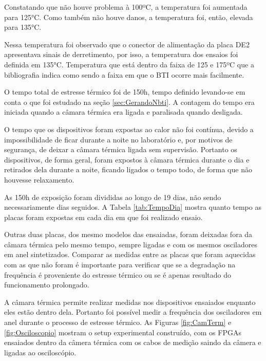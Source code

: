 Constatando que não houve problema à 100ºC, a temperatura foi aumentada para 125°C. Como também não houve danos, a temperatura foi, então, elevada para 135°C.

Nessa temperatura foi observado que o conector de alimentação da placa DE2 apresentava sinais de derretimento, por isso, a temperatura dos ensaios foi definida em 135°C. Temperatura que está dentro da faixa de 125 e 175ºC que a bibliografia indica como sendo a faixa em que o BTI ocorre mais facilmente.

O tempo total de estresse térmico foi de 150h, tempo definido levando-se em conta o que foi estudado na seção \ref{sec:GerandoNbti}. A contagem do tempo era iniciada quando a câmara térmica era ligada e paralisada quando desligada. 

O tempo que os dispositivos foram expostas ao calor não foi contínua, devido a impossibilidade de ficar durante a noite no laboratório e, por motivos de segurança, de deixar a câmara térmica ligada sem supervisão. Portanto os dispositivos, de forma geral, foram expostos à câmara térmica durante o dia e retirados dela durante a noite, ficando ligados o tempo todo, de forma que não houvesse relaxamento.

As 150h de exposição foram divididas ao longo de 19 dias, não sendo necessariamente dias seguidos. A Tabela \ref{tab:TempoDia} mostra quanto tempo as placas foram expostas em cada dia em que foi realizado ensaio.



Outras duas placas, dos mesmo modelos das ensaiadas, foram deixadas fora da câmara térmica pelo mesmo tempo, sempre ligadas e com os mesmos osciladores em anel sintetizados. Comparar as medidas entre as placas que foram aquecidas com as que não foram é importante para verificar que se a degradação na frequência é proveniente do estresse térmico ou se é apenas resultado do funcionamento prolongado.

A câmara térmica permite realizar medidas nos dispositivos ensaiados enquanto eles estão dentro dela. Portanto foi possível medir a frequência dos osciladores em anel durante o processo de estresse térmico. As Figuras \ref{fig:CamTerm} e \ref{fig:Osciloscopio} mostram o setup experimental construído, com os FPGAs ensaiados dentro da câmera térmica com os cabos de medição saindo da câmera e ligadas ao osciloscópio.

